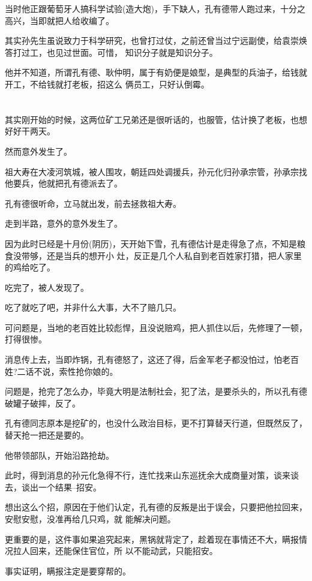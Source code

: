 \documentclass[11pt,a4paper,onecolumn]{article}
\begin{document}
当时他正跟葡萄牙人搞科学试验(造大炮)，手下缺人，孔有德带人跑过来，十分之高兴，当即就把人给收编了。

其实孙先生虽说致力于科学研究，也曾打过仗，之前还曾当过宁远副使，给袁崇焕答打过工，也见过世面。可惜，
知识分子就是知识分子。

他并不知道，所谓孔有德、耿仲明，属于有奶便是娘型，是典型的兵油子，给钱就开工，不给钱就打老板，招这么
俩员工，只好认倒霉。

\section[\thesection]{}

其实刚开始的时候，这两位矿工兄弟还是很听话的，也服管，估计换了老板，也想好好干两天。

然而意外发生了。

祖大寿在大凌河筑城，被人围攻，朝廷四处调援兵，孙元化归孙承宗管，孙承宗找他要兵，他就把孔有德派去了。

孔有德很听命，立马就出发，前去拯救祖大寿。

走到半路，意外的意外发生了。

因为此时已经是十月份(阴历)，天开始下雪，孔有德估计是走得急了点，不知是粮食没带够，还是当兵的想开小
灶，反正是几个人私自到老百姓家打猎，把人家里的鸡给吃了。

吃完了，被人发现了。

吃了就吃了吧，并非什么大事，大不了赔几只。

可问题是，当地的老百姓比较彪悍，且没说赔鸡，把人抓住以后，先修理了一顿，打得很惨。

消息传上去，当即炸锅，孔有德怒了，这还了得，后金军老子都没怕过，怕老百姓?二话不说，索性抢你娘的。

问题是，抢完了怎么办，毕竟大明是法制社会，犯了法，是要杀头的，所以孔有德破罐子破摔，反了。

孔有德同志原本是挖矿的，也没什么政治目标，更不打算替天行道，但既然反了，替天抢一把还是要的。

他带领部队，开始沿路抢劫。

此时，得到消息的孙元化急得不行，连忙找来山东巡抚余大成商量对策，谈来谈去，谈出一个结果--招安。

想出这么个招，原因在于他们认定，孔有德的反叛是出于误会，只要把他拉回来，安慰安慰，没准再给几只鸡，就
能解决问题。

更重要的是，这件事如果追究起来，黑锅就背定了，趁着现在事情还不大，瞒报情况拉人回来，还能保住官位，所
以不能动武，只能招安。

事实证明，瞒报注定是要穿帮的。
\end{document}
